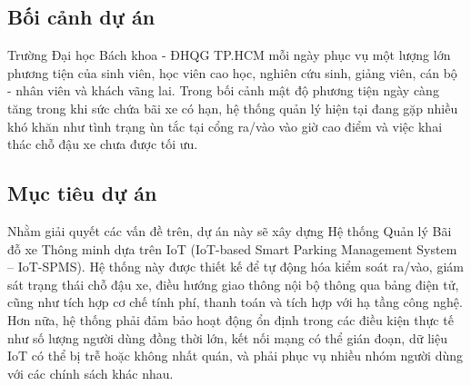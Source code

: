 \documentclass[a4paper,12pt]{article}
\begin{document}
\subsection{Bối cảnh dự án}
Trường Đại học Bách khoa - ĐHQG TP.HCM mỗi ngày phục vụ một lượng lớn phương tiện của sinh viên, học viên cao học, nghiên cứu sinh, giảng viên, cán bộ - nhân viên và khách vãng lai. Trong bối cảnh mật độ phương tiện ngày càng tăng trong khi sức chứa bãi xe có hạn, hệ thống quản lý hiện tại đang gặp nhiều khó khăn như tình trạng ùn tắc tại cổng ra/vào vào giờ cao điểm và việc khai thác chỗ đậu xe chưa được tối ưu. 


\subsection{Mục tiêu dự án}
Nhằm giải quyết các vấn đề trên, dự án này sẽ xây dựng Hệ thống Quản lý Bãi đỗ xe Thông minh dựa trên IoT (IoT-based Smart Parking Management System – IoT-SPMS). Hệ thống này được thiết kế để tự động hóa kiểm soát ra/vào, giám sát trạng thái chỗ đậu xe, điều hướng giao thông nội bộ thông qua bảng điện tử, cũng như tích hợp cơ chế tính phí, thanh toán và tích hợp với hạ tầng công nghệ. Hơn nữa, hệ thống phải đảm bảo hoạt động ổn định trong các điều kiện thực tế như số lượng người dùng đồng thời lớn, kết nối mạng có thể gián đoạn, dữ liệu IoT có thể bị trễ hoặc không nhất quán, và phải phục vụ nhiều nhóm người dùng với các chính sách khác nhau.
\end{document}
